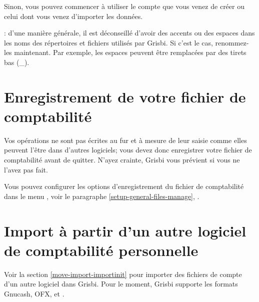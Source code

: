 Sinon, vous pouvez commencer à utiliser le compte que vous venez de créer ou celui dont vous venez d'importer les données.

\textcolor{red}{} : d'une manière générale, il est déconseillé d'avoir des accents ou des espaces dans les noms des répertoires et fichiers utilisés par Grisbi. Si c'est le cas, renommez-les maintenant. Par exemple, les espaces peuvent être remplacées par des tirets bas (\_).



\section{Enregistrement de votre fichier de comptabilité\label{start-save}}


Vos opérations ne sont pas écrites au fur et à mesure de leur saisie comme 
elles peuvent l'être dans d'autres logiciels; vous devez donc enregistrer votre fichier de comptabilité avant de quitter. N'ayez crainte, Grisbi vous prévient si vous ne l'avez pas fait. 

Vous pouvez configurer les options d'enregistrement du fichier de comptabilité dans le menu , voir le paragraphe \vref{setup-general-files-manage}, .


\section{Import à partir d'un autre logiciel de comptabilité personnelle}

Voir la section \vref{move-import-importinit} pour importer des fichiers de compte d'un autre logiciel dans Grisbi.  Pour le moment, Grisbi supporte les formats \gls{Gnucash}, \gls{OFX},  et .


